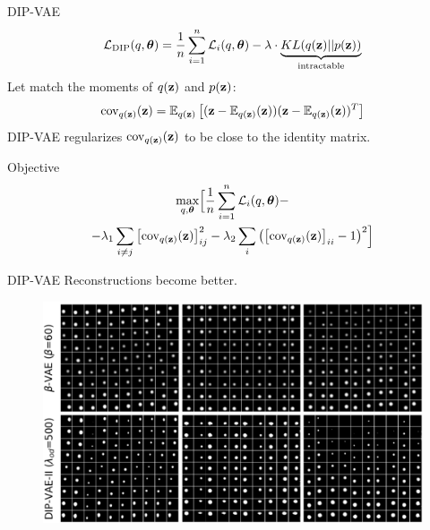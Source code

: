 \begin{frame}{DIP-VAE}
		\vspace{-0.2cm}
		\[
			\mathcal{L}_{\text{DIP}}(q, \boldsymbol{\theta}) = \frac{1}{n} \sum_{i=1}^n \mathcal{L}_i(q, \boldsymbol{\theta}) -\lambda \cdot \underbrace{KL(q(\mathbf{z}) || p(\mathbf{z}))}_{\text{intractable}}
		\]
	Let match the moments of $q(\mathbf{z})$ and $p(\mathbf{z})$:
	\[
	\text{cov}_{q(\mathbf{z})}(\mathbf{z}) = \mathbb{E}_{q(\mathbf{z})} \left[ (\mathbf{z} - \mathbb{E}_{q(\mathbf{z})}(\mathbf{z})) (\mathbf{z} - \mathbb{E}_{q(\mathbf{z})}(\mathbf{z}))^T \right]
	\]
	DIP-VAE regularizes $\text{cov}_{q(\mathbf{z})}(\mathbf{z}) $ to be close to the identity matrix. 
	\begin{block}{Objective}
		\vspace{-0.5cm}
		\begin{multline*}
		\max_{q, \boldsymbol{\theta}} \Bigl[\frac{1}{n} \sum_{i=1}^n \mathcal{L}_i(q, \boldsymbol{\theta}) - \\ - \lambda_1 \sum_{i \neq j} \left[\text{cov}_{q(\mathbf{z})} (\mathbf{z}) \right]^2_{ij} - \lambda_2 \sum_{i} \left( \left[ \text{cov}_{q(\mathbf{z})} (\mathbf{z}) \right]_{ii} - 1 \right)^2 \Bigr]
		\end{multline*}
		\vspace{-0.5cm}
	\end{block}

\end{frame}
\begin{frame}{DIP-VAE}
	Reconstructions become better.
	\begin{figure}
		\centering
		\includegraphics[width=\linewidth]{figs/dip-vae_1}
	\end{figure}

\end{frame}
